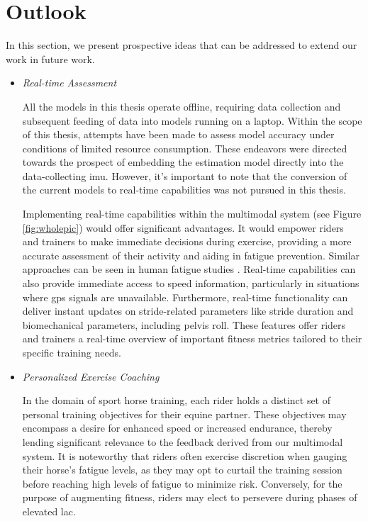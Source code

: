 \section{Outlook}
\label{sec:outlook}

In this section, we present prospective ideas that can be addressed to extend our work in future work.

\begin{itemize}[label={$\bullet$}, leftmargin=*]

\item{\textit{Real-time Assessment}}

All the models in this thesis operate offline, requiring data collection and subsequent feeding of data into models running on a laptop. Within the scope of this thesis, attempts have been made to assess model accuracy under conditions of limited resource consumption. These endeavors were directed towards the prospect of embedding the estimation model directly into the data-collecting \gls{imu}. However, it's important to note that the conversion of the current models to real-time capabilities was not pursued in this thesis.

Implementing real-time capabilities within the multimodal system (see Figure \ref{fig:wholepic}) would offer significant advantages. It would empower riders and trainers to make immediate decisions during exercise, providing a more accurate assessment of their activity and aiding in fatigue prevention. Similar approaches can be seen in human fatigue studies \cite{jiang_2022}. Real-time capabilities can also provide immediate access to speed information, particularly in situations where \gls{gps} signals are unavailable. Furthermore, real-time functionality can deliver instant updates on stride-related parameters like stride duration and biomechanical parameters, including pelvis roll. These features offer riders and trainers a real-time overview of important fitness metrics tailored to their specific training needs.

\item{\textit{Personalized Exercise Coaching}}

In the domain of sport horse training, each rider holds a distinct set of personal training objectives for their equine partner. These objectives may encompass a desire for enhanced speed or increased endurance, thereby lending significant relevance to the feedback derived from our multimodal system. It is noteworthy that riders often exercise discretion when gauging their horse's fatigue levels, as they may opt to curtail the training session before reaching high levels of fatigue to minimize risk. Conversely, for the purpose of augmenting fitness, riders may elect to persevere during phases of elevated \gls{lac}. 


\end{itemize}
